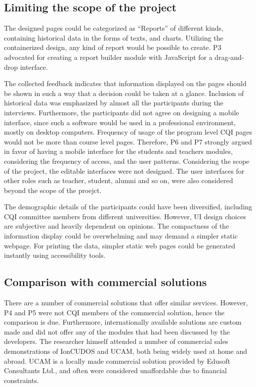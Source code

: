 \documentclass[journal,onecolumn]{IEEEtran}
\begin{document}
\begin{itemize}
   
\end{itemize}







 \subsection{\textbf{Limiting the scope of the project}}
 
The designed pages could be categorized as “Reports” of different kinds, containing historical data in the forms of texts, and charts. Utilizing the containerized design, any kind of report would be possible to create. P3 advocated for creating a report builder module with JavaScript for a drag-and-drop interface. 

The collected feedback indicates that information displayed on the pages should be shown in such a way that a decision could be taken at a glance. Inclusion of historical data was emphasized by almost all the participants during the interviews. Furthermore, the participants did not agree on designing a mobile interface, since such a software would be used in a professional environment, mostly on desktop computers. Frequency of usage of the program level CQI pages would not be more than course level pages. Therefore, P6 and P7 strongly argued in favor of having a mobile interface for the students and teachers modules, considering the frequency of access, and the user patterns. Considering the scope of the project, the editable interfaces were not designed. The user interfaces for other roles such as teacher, student, alumni and so on, were also considered beyond the scope of the proejct. 

The demographic details of the participants could have been diversified, including CQI committee members from different universities. However, UI design choices are subjective and heavily dependent on opinions. The compactness of the information display could be overwhelming and may demand a simpler static webpage. For printing the data, simpler static web pages could be generated instantly using accessibility tools. 

\subsection{Comparison with commercial solutions}
 There are a number of commercial solutions that offer similar services. However, P4 and P5 were not CQI members of the commercial solution, hence the comparison is due. Furthermore, internationally available solutions are custom made and did not offer any of the modules that had been discussed by the developers. The researcher himself attended a number of commercial sales demonstrations of IonCUDOS and UCAM, both being widely used at home and abroad. UCAM is a locally made commercial solution provided by Edusoft Consultants Ltd., and often were considered unaffordable due to financial constraints. 
\end{document}
